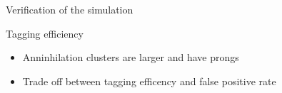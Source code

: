 \documentclass{beamer}
\begin{document}
\begin{frame}{\centering Verification of the simulation}
{    }
\end{frame}



\begin{frame}{\centering Tagging efficiency}
  \begin{itemize}
  \item<1->{Anninhilation clusters are larger and have prongs}
  \item<2->{Trade off between tagging efficency and false positive rate}
  \end{itemize}
\end{frame}
\end{document}
